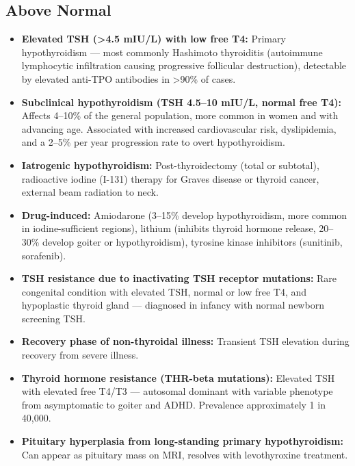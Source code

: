 \subsection*{Above Normal}
\begin{itemize}
  \item \textbf{Elevated TSH (>4.5 mIU/L) with low free T4:} Primary hypothyroidism --- most commonly Hashimoto thyroiditis (autoimmune lymphocytic infiltration causing progressive follicular destruction), detectable by elevated anti-TPO antibodies in >90\% of cases.
  \item \textbf{Subclinical hypothyroidism (TSH 4.5--10 mIU/L, normal free T4):} Affects 4--10\% of the general population, more common in women and with advancing age. Associated with increased cardiovascular risk, dyslipidemia, and a 2--5\% per year progression rate to overt hypothyroidism.
  \item \textbf{Iatrogenic hypothyroidism:} Post-thyroidectomy (total or subtotal), radioactive iodine (I-131) therapy for Graves disease or thyroid cancer, external beam radiation to neck.
  \item \textbf{Drug-induced:} Amiodarone (3--15\% develop hypothyroidism, more common in iodine-sufficient regions), lithium (inhibits thyroid hormone release, 20--30\% develop goiter or hypothyroidism), tyrosine kinase inhibitors (sunitinib, sorafenib).
  \item \textbf{TSH resistance due to inactivating TSH receptor mutations:} Rare congenital condition with elevated TSH, normal or low free T4, and hypoplastic thyroid gland --- diagnosed in infancy with normal newborn screening TSH.
  \item \textbf{Recovery phase of non-thyroidal illness:} Transient TSH elevation during recovery from severe illness.
  \item \textbf{Thyroid hormone resistance (THR-beta mutations):} Elevated TSH with elevated free T4/T3 --- autosomal dominant with variable phenotype from asymptomatic to goiter and ADHD. Prevalence approximately 1 in 40,000.
  \item \textbf{Pituitary hyperplasia from long-standing primary hypothyroidism:} Can appear as pituitary mass on MRI, resolves with levothyroxine treatment.
\end{itemize}

